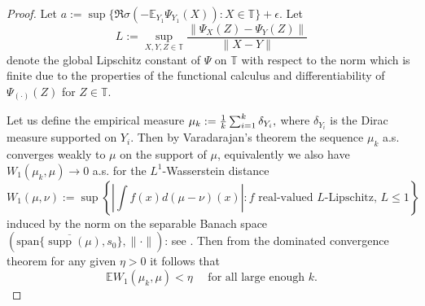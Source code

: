 \documentclass[12pt,reqno]{amsart}
\DeclareMathOperator{\supp}{\mathrm{supp}}
\begin{document}
\begin{proof}
Let $a:=\sup\{\Re\sigma(-\mathbb{E}_{Y_1}\Psi_{Y_1}(X)):X\in \mathbb{T}\}+\epsilon$. Let $$L:=\sup_{X,Y,Z\in\mathbb{T}}\frac{\|\Psi_X(Z)-\Psi_Y(Z)\|}{\|X-Y\|}$$ denote the global Lipschitz constant of $\Psi$ on $\mathbb{T}$ with respect to the norm which is finite due to the properties of the functional calculus and differentiability of $\Psi_{(\cdot)}(Z)$ for $Z\in\mathbb{T}$.

Let us define the empirical measure $\mu_k:={1 \over k} \sum_{i=1}^k\delta_{Y_i},$ where $\delta_{Y_i}$ is the Dirac measure supported on $Y_i.$ Then by Varadarajan's theorem \cite[Theorem 11.4.1]{Dudley} the sequence $\mu_k$ a.s. converges weakly to $\mu$ on the support of $\mu$, equivalently we also have $W_1(\mu_k,\mu)\to 0$ a.s. for the $L^1$-Wasserstein distance
\begin{equation*}
W_1(\mu,\nu) := \sup\left\{ \left| \int f(x)d(\mu-\nu)(x) \right|: f \text{ real-valued } L\text{-Lipschitz, } L \leq 1 \right\}
\end{equation*}
induced by the norm on the separable Banach space $\left( \overline{\mathrm{span}\{\supp(\mu),s_0\}}, \| \cdot \| \right)$: see \cite[Theorem 11.3.3]{Dudley}. Then from the dominated convergence theorem for any given $\eta>0$ it follows that
\begin{equation}\label{eq:wass_P2}
\mathbb{E}W_1(\mu_k,\mu) < \eta \quad \text{ for all large enough } k.
\end{equation}


\end{proof}
\end{document}
